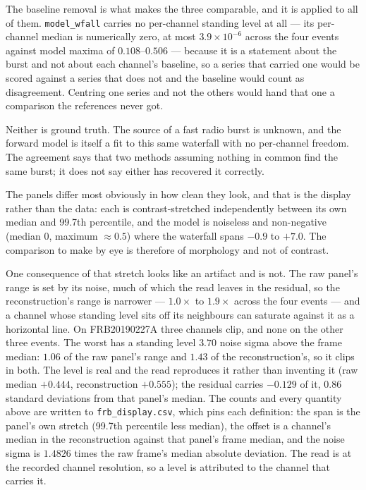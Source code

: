 \documentclass[10pt,letterpaper,twocolumn]{article}
\begin{document}
The baseline removal is what makes the three comparable, and it is applied to all of them. \texttt{model\_\allowbreak{}wfall} carries no per-channel standing level at all --- its per-channel median is numerically zero, at most \(3.9\times10^{-6}\) across the four events against model maxima of \(0.108\)--\(0.506\) --- because it is a statement about the burst and not about each channel's baseline, so a series that carried one would be scored against a series that does not and the baseline would count as disagreement. Centring one series and not the others would hand that one a comparison the references never got.

Neither is ground truth. The source of a fast radio burst is unknown, and the forward model is itself a fit to this same waterfall with no per-channel freedom. The agreement says that two methods assuming nothing in common find the same burst; it does not say either has recovered it correctly.

The panels differ most obviously in how clean they look, and that is the display rather than the data: each is contrast-stretched independently between its own median and 99.7th percentile, and the model is noiseless and non-negative (median \(0\), maximum \(\approx0.5\)) where the waterfall spans \(-0.9\) to \(+7.0\). The comparison to make by eye is therefore of morphology and not of contrast.

One consequence of that stretch looks like an artifact and is not. The raw panel's range is set by its noise, much of which the read leaves in the residual, so the reconstruction's range is narrower --- \(1.0\times\) to \(1.9\times\) across the four events --- and a channel whose standing level sits off its neighbours can saturate against it as a horizontal line. On FRB20190227A three channels clip, and none on the other three events. The worst has a standing level \(3.70\) noise sigma above the frame median: \(1.06\) of the raw panel's range and \(1.43\) of the reconstruction's, so it clips in both. The level is real and the read reproduces it rather than inventing it (raw median \(+0.444\), reconstruction \(+0.555\)); the residual carries \(-0.129\) of it, \(0.86\) standard deviations from that panel's median. The counts and every quantity above are written to \texttt{frb\_\allowbreak{}display.\allowbreak{}csv}, which pins each definition: the span is the panel's own stretch (99.7th percentile less median), the offset is a channel's median in the reconstruction against that panel's frame median, and the noise sigma is \(1.4826\) times the raw frame's median absolute deviation. The read is at the recorded channel resolution, so a level is attributed to the channel that carries it.
\end{document}
